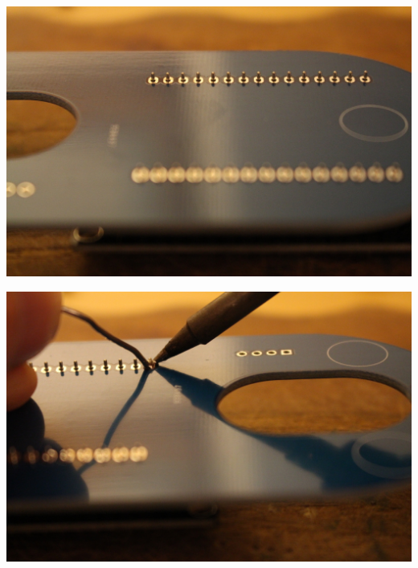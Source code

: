 \documentclass{article}
\begin{document}
\vspace{0.5cm}

\begin{minipage}[b]{0.5\textwidth}
	\includegraphics[width=\textwidth]{Bilder2019/IMG_6463.JPG}
\end{minipage}
\begin{minipage}[b]{0.5\textwidth}
	\includegraphics[width=\textwidth]{Bilder2019/IMG_6466.JPG}
\end{minipage}

\vspace{0.5cm}
\end{document}
